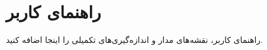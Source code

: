 \section{راهنمای کاربر}

راهنمای کاربر، نقشه‌های مدار و اندازه‌گیری‌های تکمیلی را اینجا اضافه کنید.
